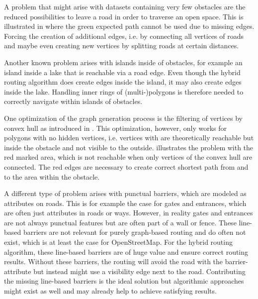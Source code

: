 		A problem that might arise with datasets containing very few obstacles are the reduced possibilities to leave a road in order to traverse an open space.
		This is illustrated in  where the green expected path cannot be used due to missing edges.
		Forcing the creation of additional edges, i.e. by connecting all vertices of roads and maybe even creating new vertices by splitting roads at certain distances.
		
		Another known problem arises with islands inside of obstacles, for example an island inside a lake that is reachable via a road edge.
		Even though the hybrid routing algorithm does create edges inside the island, it may also create edges inside the lake.
		Handling inner rings of (multi-)polygons is therefore needed to correctly navigate within islands of obstacles.
		
		One optimization of the graph generation process is the filtering of vertices by convex hull as introduced in .
		This optimization, however, only works for polygons with no hidden vertices, i.e. vertices with are theoretically reachable but inside the obstacle and not visible to the outside.
		 illustrates the problem with the red marked area, which is not reachable when only vertices of the convex hull are connected.
		The red edges are necessary to create correct shortest path from and to the area within the obstacle.
		
		A different type of problem arises with punctual barriers, which are modeled as attributes on roads.
		This is for example the case for gates and entrances, which are often just attributes in roads or ways.
		However, in reality gates and entrances are not always punctual features but are often part of a wall or fence.
		These line-based barriers are not relevant for purely graph-based routing and do often not exist, which is at least the case for OpenStreetMap.
		For the hybrid routing algorithm, these line-based barriers are of huge value and ensure correct routing results.
		Without these barriers, the routing will avoid the road with the barrier-attribute but instead might use a visibility edge next to the road.
		Contributing the missing line-based barriers is the ideal solution but algorithmic approaches might exist as well and may already help to achieve satisfying results.
		
